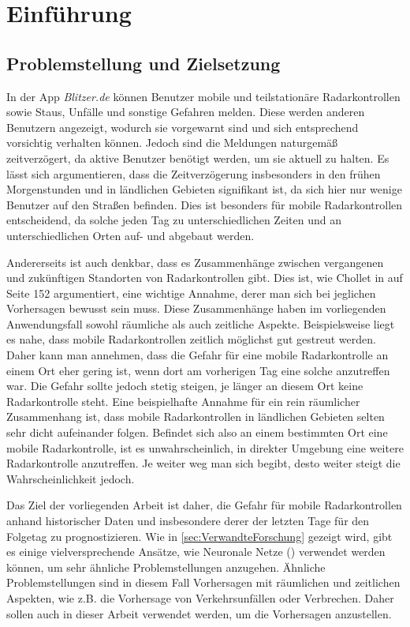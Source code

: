 \section{Einführung}
\label{sec:Einführung}

\subsection{Problemstellung und Zielsetzung}
\label{sec:Problemstellung}
In der App \emph{Blitzer.de} können Benutzer mobile und teilstationäre Radarkontrollen sowie Staus, Unfälle und sonstige Gefahren melden.
Diese werden anderen Benutzern angezeigt, wodurch sie vorgewarnt sind und sich entsprechend vorsichtig verhalten können.
Jedoch sind die Meldungen naturgemäß zeitverzögert, da aktive Benutzer benötigt werden, um sie aktuell zu halten.
Es lässt sich argumentieren, dass die Zeitverzögerung insbesonders in den frühen Morgenstunden und in ländlichen Gebieten signifikant ist,
da sich hier nur wenige Benutzer auf den Straßen befinden.
Dies ist besonders für mobile Radarkontrollen entscheidend, da solche jeden Tag zu unterschiedlichen Zeiten und an unterschiedlichen Orten auf- und abgebaut werden.

Andererseits ist auch denkbar, dass es Zusammenhänge zwischen vergangenen und zukünftigen Standorten von Radarkontrollen gibt.
Dies ist, wie Chollet in \cite{DeepLearningPythonKeras} auf Seite 152 argumentiert, eine wichtige Annahme, derer man sich bei jeglichen Vorhersagen bewusst sein muss.
Diese Zusammenhänge haben im vorliegenden Anwendungsfall sowohl räumliche als auch zeitliche Aspekte.
Beispielsweise liegt es nahe, dass mobile Radarkontrollen zeitlich möglichst gut gestreut werden.
Daher kann man annehmen, dass die Gefahr für eine mobile Radarkontrolle an einem Ort eher gering ist, wenn dort am vorherigen Tag eine solche anzutreffen war.
Die Gefahr sollte jedoch stetig steigen, je länger an diesem Ort keine Radarkontrolle steht.
Eine beispielhafte Annahme für ein rein räumlicher Zusammenhang ist, dass mobile Radarkontrollen in ländlichen Gebieten selten sehr dicht aufeinander folgen.
Befindet sich also an einem bestimmten Ort eine mobile Radarkontrolle, ist es unwahrscheinlich, in direkter Umgebung eine weitere Radarkontrolle anzutreffen.
Je weiter weg man sich begibt, desto weiter steigt die Wahrscheinlichkeit jedoch.

Das Ziel der vorliegenden Arbeit ist daher, die Gefahr für mobile Radarkontrollen anhand historischer Daten und insbesondere derer der letzten Tage für den Folgetag zu prognostizieren.
Wie in \autoref{sec:VerwandteForschung} gezeigt wird, gibt es einige vielversprechende Ansätze, wie Neuronale Netze () verwendet werden können, um sehr ähnliche Problemstellungen anzugehen.
Ähnliche Problemstellungen sind in diesem Fall Vorhersagen mit räumlichen und zeitlichen Aspekten, wie z.B. die Vorhersage von Verkehrsunfällen oder Verbrechen.
Daher sollen auch in dieser Arbeit  verwendet werden, um die Vorhersagen anzustellen.


